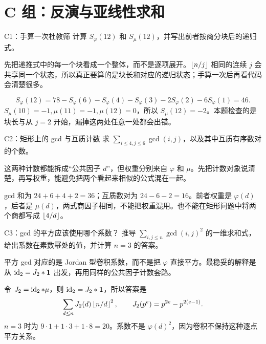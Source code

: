 \section{C 组：反演与亚线性求和}
\begin{problem}{C1：手算一次杜教筛}
计算 $S_\varphi(12)$ 和 $S_\mu(12)$，并写出前者按商分块后的递归式。
\end{problem}

\begin{pitfall}[讲解：先看这题到底在做什么]
先把递推式中的每一个块看成一个整体，而不是逐项展开。$\left\lfloor n/j\right\rfloor$ 相同的连续 $j$ 会共享同一个状态，所以真正要算的是块长和对应的递归状态；手算一次后再看代码会清楚很多。
\end{pitfall}

\sol
\[
S_\varphi(12)=78-S_\varphi(6)-S_\varphi(4)-S_\varphi(3)-2S_\varphi(2)-6S_\varphi(1)=46.
\]
$S_\mu(10)=-1,\mu(11)=-1,\mu(12)=0$，所以 $S_\mu(12)=-2$。本题检查的是块长与从 $j=2$ 开始，漏掉这两处任意一处都会出错。


\begin{problem}{C2：矩形上的 gcd 与互质计数}
求 $\sum_{i\le4,j\le6}\gcd(i,j)$，以及其中互质有序数对的个数。
\end{problem}

\begin{pitfall}[讲解：先看这题到底在做什么]
这两种计数都能拆成“公共因子 $d$”，但权重分别来自 $\varphi$ 和 $\mu$。先把计数对象说清楚，再写权重，能避免把两个看起来相似的公式混在一起。
\end{pitfall}

\sol gcd 和为 $24+6+4+2=36$；互质数对为 $24-6-2=16$。前者权重是 $\varphi(d)$，后者是 $\mu(d)$，两式商因子相同，不能把权重混用。也不能在矩形问题中将两个商都写成 $\left\lfloor 4/d\right\rfloor$。


\begin{problem}{C3：gcd 的平方应该使用哪个系数？}
推导 $\sum_{i,j\le n}\gcd(i,j)^2$ 的一维求和式，给出系数在素数幂处的值，并计算 $n=3$ 的答案。
\end{problem}

\begin{pitfall}[讲解：先看这题到底在做什么]
平方 gcd 对应的是 Jordan 型卷积系数，而不是把 $\varphi$ 直接平方。最稳妥的解释是从 $\operatorname{id}_2=J_2*\mathbf 1$ 出发，再用同样的公共因子计数套路。
\end{pitfall}

\sol 令 $J_2=\operatorname{id}_2*\mu$，则 $\operatorname{id}_2=J_2*\mathbf 1$，所以答案是
\[
 \sum_{d\le n}J_2(d)\left\lfloor n/d\right\rfloor^2,\qquad
 J_2(p^e)=p^{2e}-p^{2(e-1)}.
\]
$n=3$ 时为 $9\cdot1+1\cdot3+1\cdot8=20$。系数不是 $\varphi(d)^2$，因为卷积不保持这种逐点平方关系。


